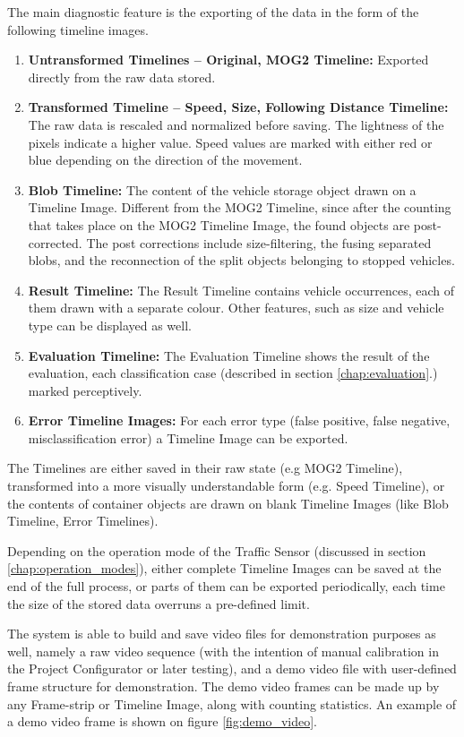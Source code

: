 The main diagnostic feature is the exporting of the data in the form of the following timeline images.
\begin{enumerate}
	\item \textbf{Untransformed Timelines -- Original, MOG2 Timeline: } Exported directly from the raw data stored.
	\item \textbf{Transformed Timeline -- Speed, Size, Following Distance Timeline: } The raw data is rescaled and normalized before saving. The lightness of the pixels indicate a higher value. Speed values are marked with either red or blue depending on the direction of the movement. 
	\item \textbf{Blob Timeline: } The content of the vehicle storage object drawn on a Timeline Image. Different from the MOG2 Timeline, since after the counting that takes place on the MOG2 Timeline Image, the found objects are post-corrected. The post corrections include size-filtering, the fusing separated blobs, and the reconnection of the split objects belonging to stopped vehicles.
	\item \textbf{Result Timeline: } The Result Timeline contains vehicle occurrences, each of them drawn with a separate colour. Other features, such as size and vehicle type can be displayed as well.
	\item \textbf{Evaluation Timeline: } The Evaluation Timeline shows the result of the evaluation, each classification case (described in section \ref{chap:evaluation}.) marked perceptively.
	\item \textbf{Error Timeline Images: } For each error type (false positive, false negative, misclassification error) a Timeline Image can be exported.
\end{enumerate} 
The Timelines are either saved in their raw state (e.g MOG2 Timeline), transformed into a more visually understandable form (e.g. Speed Timeline), or the contents of container objects are drawn on blank Timeline Images (like Blob Timeline, Error Timelines).

Depending on the operation mode of the Traffic Sensor (discussed in section \ref{chap:operation_modes}), either complete Timeline Images can be saved at the end of the full process, or parts of them can be exported periodically, each time the size of the stored data overruns a pre-defined limit.

The system is able to build and save video files for demonstration purposes as well, namely a raw video sequence (with the intention of manual calibration in the Project Configurator or later testing), and a demo video file with user-defined frame structure for demonstration.
The demo video frames can be made up by any Frame-strip or Timeline Image, along with counting statistics.
An example of a demo video frame is shown on figure \ref{fig:demo_video}.

